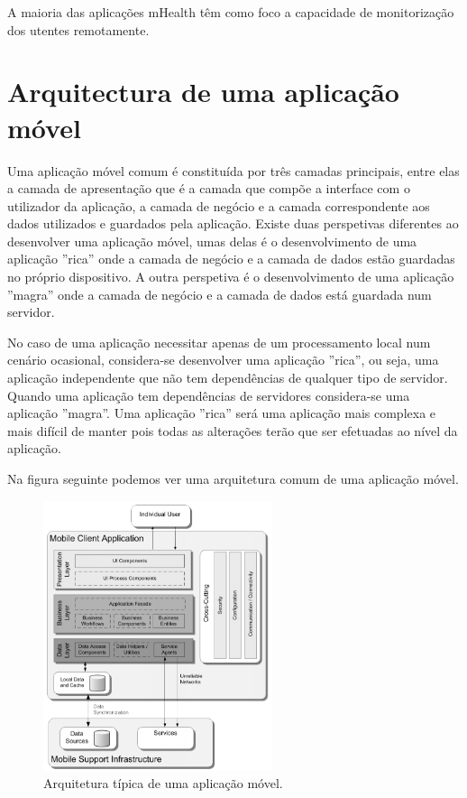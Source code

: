 A maioria das aplica\c c\~oes mHealth t\^em como foco a capacidade de monitoriza\c c\~ao dos utentes remotamente.

\section{Arquitectura de uma aplica\c c\~ao m\'ovel}

Uma aplicação móvel comum é constituída por três camadas principais, entre elas a camada de apresentação que é a camada que compõe a interface com o utilizador da aplicação, a camada de negócio e a camada correspondente aos dados utilizados e guardados pela aplicação. Existe duas perspetivas diferentes ao desenvolver uma aplicação móvel, umas delas é o desenvolvimento de uma aplicação ''rica'' onde a camada de negócio e a camada de dados estão guardadas no próprio dispositivo. A outra perspetiva é o desenvolvimento de uma aplicação ''magra'' onde a camada de negócio e a camada de dados está guardada num servidor. 

No caso de uma aplicação necessitar apenas de um processamento local num cenário ocasional, considera-se desenvolver uma aplicação ''rica'', ou seja, uma aplicação independente que não tem dependências de qualquer tipo de servidor. Quando uma aplicação tem dependências de servidores considera-se uma aplicação ''magra''. Uma aplicação ''rica'' será uma aplicação mais complexa e mais difícil de manter pois todas as alterações terão que ser efetuadas ao nível da aplicação.


Na figura seguinte podemos ver uma arquitetura comum de uma aplicação móvel. \cite{mobileappbook}

\begin{figure}[H]
  \centering
  \includegraphics[width=0.6\textwidth]{imgs/mobileapparch.png}
  \caption[Arquitetura t\'ipica de uma  aplica\c c\~ao móvel]{Arquitetura t\'ipica de uma  aplica\c c\~ao móvel. \cite{mobileappbook}}
  
  \label{f:mobileapparch}
\end{figure}


